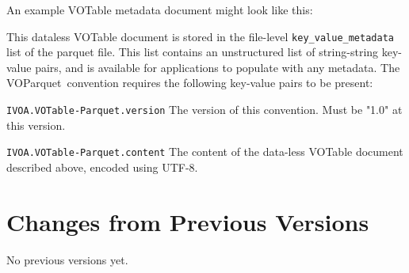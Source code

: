 \documentclass[11pt,a4paper]{ivoa}
\newcommand{\voparquet}{VOParquet}
\begin{document}
An example VOTable metadata document might look like this:


This dataless VOTable document is stored in the file-level
{\tt key\_value\_metadata} list of the parquet file.
This list contains an unstructured list of string-string key-value pairs,
and is available for applications to populate with any metadata.
The \voparquet\ convention requires the following key-value pairs
to be present:
\begin{bigdescription}
\item[{\tt IVOA.VOTable-Parquet.version}]
   The version of this convention.  Must be "1.0" at this version.
\item[{\tt IVOA.VOTable-Parquet.content}]
   The content of the data-less VOTable document described above,
   encoded using UTF-8.
\end{bigdescription}


\appendix
\section{Changes from Previous Versions}

No previous versions yet.


\end{document}
